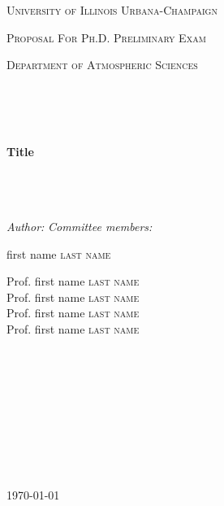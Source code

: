 \documentclass[11pt]{article} %
\begin{document}
\singlespacing
{} %

\parbox[t][2cm][c]{\textwidth}{\LARGE
    \begin{center} \textsc{University of Illinois Urbana-Champaign} \end{center}}

\parbox[t][1cm][c]{\textwidth}{\Large
    \begin{center} \textsc{Proposal For Ph.D. Preliminary Exam}\end{center}}

\parbox[t][1cm][c]{\textwidth}{\large
    \begin{center} \textsc{Department of Atmospheric Sciences}\end{center}}
\\
\\
\\
\parbox[t][9cm][c]{\linewidth}{%
    \raisebox{-0.5\height}{\rule{\linewidth}{2pt}}
    \huge \begin{center} {\textbf{Title}}\end{center}
    \raisebox{0.5\height}{\rule{\linewidth}{2pt}}}
\\
\\
\\
\textit{Author:} \hfill \textit{Committee members:}\\
\noindent
\begin{minipage}[t]{0.4\textwidth}
  first name \textsc{last name}
\end{minipage}%
\hfill
\begin{minipage}[t]{0.6\textwidth}
  \raggedleft
  Prof. first name \textsc{last name} \\
  Prof. first name \textsc{last name} \\
  Prof. first name \textsc{last name} \\
  Prof. first name \textsc{last name}
\end{minipage}
\\
\\
\\
\\
\\
\\
\\
\\
\centerline{\today}

\newpage
\pagestyle{fancy}
\fancyhf{} %
\rfoot{\thepage} %
\renewcommand{\headrulewidth}{0pt} %
\setcounter{page}{1} %
\end{document}
